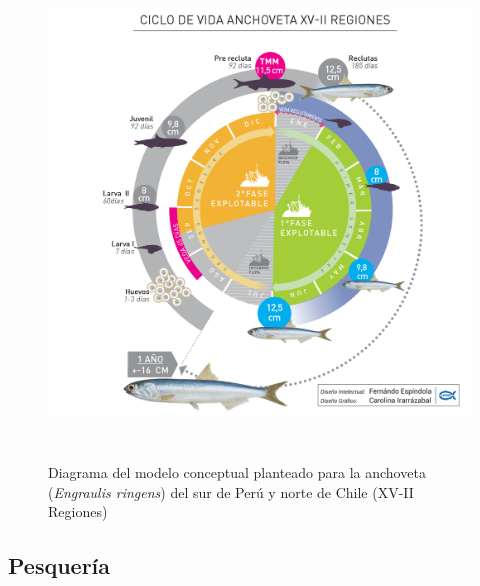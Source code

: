 \documentclass[letter,11pt]{article}
\begin{document}
\vspace{0.5cm}
\begin{figure}[htb!]
 \centering
 \includegraphics[width=17cm,height=13cm]{Figuras/figura5.pdf}
 \caption{Diagrama del modelo conceptual planteado para la anchoveta (\textit{Engraulis ringens}) del sur de Per\'u y norte de Chile (XV-II Regiones)}
 \label{Fig5}
\end{figure}


\subsection{Pesquer\'ia}
\end{document}
